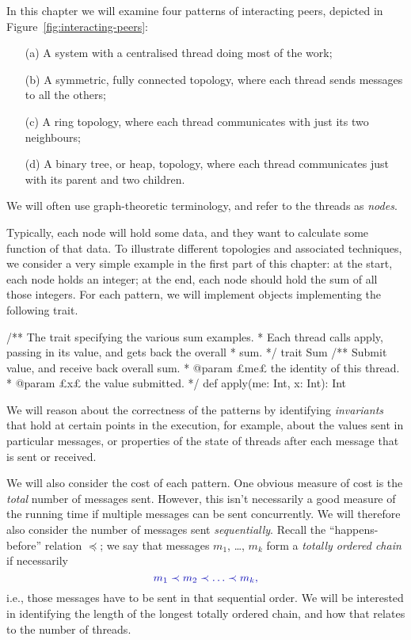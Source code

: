 
In this chapter we will examine four patterns of interacting peers, depicted
in Figure~\ref{fig:interacting-peers}: 
%
\begin{enumerate}
\item[(a)] A system with a centralised thread doing most of the work;

\item[(b)] A symmetric, fully connected topology, where each thread sends
  messages to all the others;

\item[(c)] A ring topology, where each thread communicates with just its two
  neighbours;

\item[(d)] A binary tree, or heap, topology, where each thread communicates
  just with its parent and two children.
\end{enumerate}
%
We will often use graph-theoretic terminology, and refer to the threads as
\emph{nodes}.  

Typically, each node will hold some data, and they want to calculate some
function of that data.  To illustrate different topologies and associated
techniques, we consider a very simple example in the first part of this
chapter: at the start, each node holds an integer; at the end, each node
should hold the sum of all those integers.
%
For each pattern, we will implement objects implementing the following trait. 
\begin{scala}
/** The trait specifying the various sum examples.
  * Each thread calls apply, passing in its value, and gets back the overall
  * sum. */
trait Sum{
  /** Submit value, and receive back overall sum. 
    * @param £me£ the identity of this thread.
    * @param £x£ the value submitted. */
  def apply(me: Int, x: Int): Int
}
\end{scala}


We will reason about the correctness of the patterns by identifying
\emph{invariants} that hold at certain points in the execution, for example,
about the values sent in particular messages, or properties of the state of
threads after each message that is sent or received.

We will also consider the cost of each pattern.  One obvious measure of cost
is the \emph{total} number of messages sent.  However, this isn't necessarily
a good measure of the running time if multiple messages can be sent
concurrently.
%
We will therefore also consider the number of messages sent
\emph{sequentially}.  Recall the ``happens-before'' relation $\preceq$; we say
that messages $m_1$, \ldots, $m_k$ form a \emph{totally ordered chain} if
necessarily 
\[\mstyle
m_1 \prec m_2 \prec \ldots \prec m_k,
\]
i.e., those messages have to be sent in that sequential order.  We will be
interested in identifying the length of the longest totally ordered chain, and
how that relates to the number of threads.

